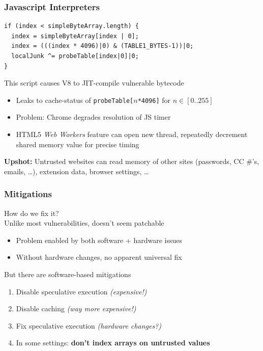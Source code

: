 \documentclass[10pt,handout]{beamer}
\begin{document}
\begin{frame}[fragile]

\frametitle{Javascript Interpreters}

\begin{lstlisting}[basicstyle=\small,style=customjava]
if (index < simpleByteArray.length) {
  index = simpleByteArray[index | 0];
  index = (((index * 4096)|0) & (TABLE1_BYTES-1))|0;
  localJunk ^= probeTable[index|0]|0;
}
\end{lstlisting}

\vspace*{1em}
This script causes V8 to JIT-compile vulnerable bytecode
\pause
\begin{itemize}
  \item Leaks to cache-status of \texttt{probeTable[}$n$\texttt{*4096]} for $n\in[0..255]$
  \pause\item Problem: Chrome degrades resolution of JS timer
  \pause\item HTML5 \emph{Web Workers} feature can open new thread, repeatedly decrement shared memory value for precise timing
\end{itemize}

\pause
\begin{center}
\textbf{Upshot:} Untrusted websites can read memory of other sites (passwords, CC \#'s, emails, \ldots), extension data, browser settings, \ldots
\end{center}

\end{frame}


\begin{frame}

\frametitle{Mitigations}

How do we fix it?
\\[1em]

\pause
Unlike most vulnerabilities, doesn't seem patchable \pause
\begin{itemize}
\item Problem enabled by both software + hardware issues
\item Without hardware changes, no apparent universal fix\\[1em]
\end{itemize}

\pause
But there are software-based mitigations
\begin{enumerate}
  \pause\item Disable speculative execution \emph{(expensive!)}
  \pause\item Disable caching \emph{(way more expensive!)}
  \pause\item Fix speculative execution \emph{(hardware changes?)}
  \pause\item In some settings: \textbf{don't index arrays on untrusted values}
\end{enumerate}

\end{frame}
\end{document}
